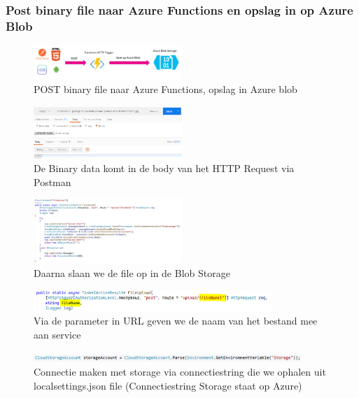 \documentclass{article}
\begin{document}
\subsubsection{Post binary file naar Azure Functions en opslag in op Azure Blob}

\begin{figure}[H]
    \centering
    \includegraphics[width=0.5\textwidth]{azure-storage-scenario-1.png}
    \caption{POST binary file naar Azure Functions, opslag in Azure blob}
\end{figure}

\begin{figure}[H]
    \centering
    \includegraphics[width=0.5\textwidth]{scenario-1-1.png}
    \caption{De Binary data komt in de body van het HTTP Request via Postman}
\end{figure}

\begin{figure}[H]
    \centering
    \includegraphics[width=0.5\textwidth]{scenario-1-2.png}
    \caption{Daarna slaan we de file op in de Blob Storage}
\end{figure}

\begin{figure}[H]
    \centering
    \includegraphics[width=0.8\textwidth]{scenario-1-3.png}
    \caption{Via de parameter in URL geven we de naam van het bestand mee aan service}
\end{figure}

\begin{figure}[H]
    \centering
    \includegraphics[width=0.9\textwidth]{scenario-1-4.png}
    \caption{Connectie maken met storage via connectiestring die we ophalen uit localsettings.json file (Connectiestring Storage staat op Azure)}
\end{figure}
\end{document}

